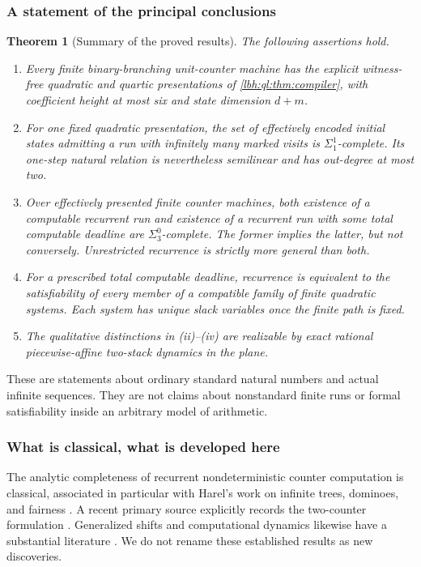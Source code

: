 \documentclass[11pt,letterpaper]{article}
\newtheorem{theorem}{Theorem}[section]
\theoremstyle{definition}
\theoremstyle{remark}
\newcommand{\1}{\mathbf 1}
\begin{document}
\subsubsection{A statement of the principal conclusions}
\begin{theorem}[Summary of the proved results]\label{lbh:ql:thm:summary}
The following assertions hold.
\begin{enumerate}[label=(\roman*)]
\item Every finite binary-branching unit-counter machine has the explicit
witness-free quadratic and quartic presentations of
\cref{lbh:ql:thm:compiler}, with coefficient height at most six and state dimension
$d+m$.
\item For one fixed quadratic presentation, the set of effectively encoded
initial states admitting a run with infinitely many marked visits is
$\Sigma^1_1$-complete. Its one-step natural relation is nevertheless
semilinear and has out-degree at most two.
\item Over effectively presented finite counter machines, both existence of
a computable recurrent run and existence of a recurrent run with some total
computable deadline are $\Sigma^0_3$-complete. The former implies the latter,
but not conversely. Unrestricted recurrence is strictly more general than
both.
\item For a prescribed total computable deadline, recurrence is equivalent
to the satisfiability of every member of a compatible family of finite
quadratic systems. Each system has unique slack variables once the finite
path is fixed.
\item The qualitative distinctions in (ii)--(iv) are realizable by exact
rational piecewise-affine two-stack dynamics in the plane.
\end{enumerate}
\end{theorem}
These are statements about ordinary standard natural numbers and actual
infinite sequences. They are not claims about nonstandard finite runs or
formal satisfiability inside an arbitrary model of arithmetic.

\subsubsection{What is classical, what is developed here}
The analytic completeness of recurrent nondeterministic counter computation
is classical, associated in particular with Harel's work on infinite trees,
dominoes, and fairness \cite{harel1986}. A recent primary source explicitly records
the two-counter formulation \cite[Appendix A]{chodil-kucera}. Generalized shifts
and computational dynamics likewise have a substantial literature
\cite{moore1991}. We do not rename these established results as new discoveries.
\end{document}
